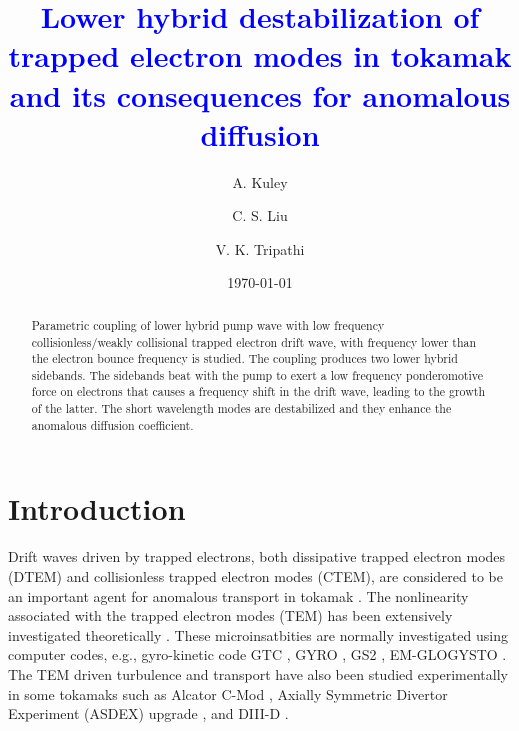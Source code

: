 \documentclass[aip,pop,amsmath,amssymb,showpacs,reprint,floatfix,lengthcheck]{revtex4-1}
\begin{document}

\title{\textcolor{blue}{Lower hybrid destabilization of trapped electron modes in tokamak and its consequences for anomalous diffusion}}%


\author{A. Kuley}
\author{C. S. Liu}
\author{V. K. Tripathi}
\date{\today}%

\begin{abstract}
Parametric coupling of  lower hybrid pump wave with  low frequency collisionless/weakly collisional trapped electron drift wave, with frequency lower than the electron bounce frequency is studied. The coupling produces two lower hybrid sidebands. The sidebands beat with the pump to exert a low frequency ponderomotive force on electrons that causes a frequency shift in the drift wave, leading to the growth of the latter. The short wavelength modes are destabilized and they enhance the anomalous diffusion coefficient.


\end{abstract}


\maketitle

\section{Introduction}
Drift waves driven by trapped electrons, both dissipative trapped electron modes (DTEM) and collisionless trapped electron modes (CTEM), are considered to be an important agent for anomalous transport in  tokamak 
\cite{kadomtsev1971trapped,RevModPhys.71.735,PhysRevLett.103.085004,deng2009properties,lin2009studies,diamond2009physics,wesson2011tokamaks,doyle2007plasma,conner1994survey,dimits2000comparisons,jenko2000electron,lin1998turbulent,chowdhury2009comprehensive}. 
The nonlinearity associated with the trapped electron modes (TEM) has been extensively investigated theoretically \cite{gang1990nonlinear,gang1991kinetic,hahm1991weak,hahm1991nonlinear,beer1996bounce}. These microinsatbities are normally investigated using computer codes, e.g., gyro-kinetic code  GTC \cite{PhysRevLett.103.085004,deng2009properties}, GYRO \cite{lin2009studies,kinsey2006effect}, GS2 \cite{ernst2004role}, EM-GLOGYSTO \cite{chowdhury2009comprehensive}.
The TEM driven turbulence and transport have also been studied experimentally in some tokamaks such as Alcator C-Mod \cite{ernst2004role}, Axially Symmetric Divertor Experiment (ASDEX) upgrade \cite{PhysRevLett.86.5498}, and DIII-D \cite{deboo2005search}.
 
\end{document}
